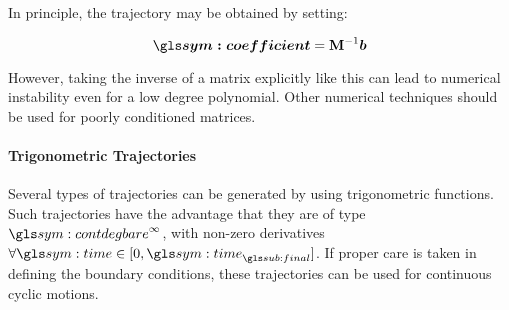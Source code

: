 				In principle, the trajectory may be obtained by setting:

				\begin{equation}
					\vec{\coefficient} = {\mat{M}}^{-1}\vec{b}
				\end{equation}

				However, taking the inverse of a matrix explicitly like this can
				lead to numerical instability even for a low degree polynomial.
				Other numerical techniques should be used for poorly conditioned
				matrices.


			\paragraph{Trigonometric Trajectories}%
			\label{trigonometric_trajectories}

				Several types of trajectories can be generated by using
				trigonometric functions. Such trajectories have the advantage
				that they are of type
				\(
					\contdeg{\infty}
				\), with non-zero derivatives
				\(
					\forall \timesym \in [0, \timesym_{\final}]
				\).
				If proper care is taken in defining the boundary conditions,
				these trajectories can be used for continuous cyclic motions.

